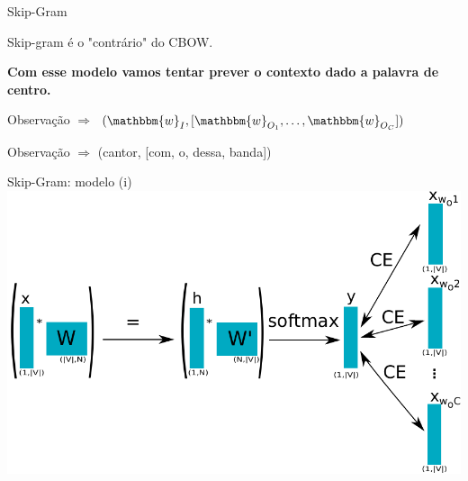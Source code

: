 \documentclass{beamer}
\newcommand{\wo}{\mathbbm{w}}
\begin{document}
\begin{frame}[fragile]{Skip-Gram}
\begin{center}
Skip-gram é o "contrário" do CBOW.
\end{center}

\vspace{0.3cm}

\textbf{Com esse modelo vamos tentar prever o contexto dado a palavra de centro.}\\

\vspace{0.3cm}

Observação $\Rightarrow$ $(\wo_{I},[\wo_{O_{1}},\dots, \wo_{O_{C}}])$\\

\vspace{0.1cm}

{\color{white!89}Observação } $\Rightarrow$ (cantor, [com, o, dessa, banda])
\end{frame}

\begin{frame}[fragile]{Skip-Gram: modelo (i)}
\includegraphics[scale=0.65]{skip-gram.pdf}
\end{frame}
\end{document}
